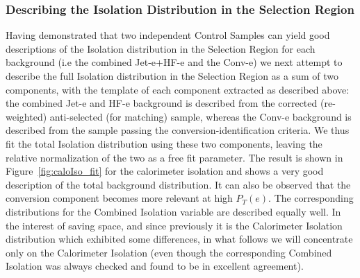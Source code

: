 \subsubsection{Describing the Isolation Distribution in the Selection Region}

Having demonstrated that two independent Control Samples can yield good descriptions of the Isolation distribution in the Selection Region for each background (i.e the combined Jet-e+HF-e and the Conv-e) we next attempt to describe the full Isolation distribution in the Selection Region as a sum of two components, with the template of each component extracted as described above: the combined Jet-e and HF-e background is described from the corrected (re-weighted) anti-selected (for matching) sample, whereas the Conv-e background is described from the sample passing the conversion-identification criteria.  We thus fit the total Isolation distribution using these two components, leaving the relative normalization of the two as a free fit parameter.  The result is shown in Figure~\ref{fig:caloIso_fit} for the calorimeter isolation and shows a very good description of the total background distribution.  It can also be observed that the conversion component becomes more relevant at high $P_T(e)$.  The corresponding distributions for the Combined Isolation variable are described equally well.  In the interest of saving space, and since previously it is the Calorimeter Isolation distribution which exhibited some differences, in what follows we will concentrate only on the Calorimeter Isolation (even though the corresponding Combined Isolation was always checked and found to be in excellent agreement).

